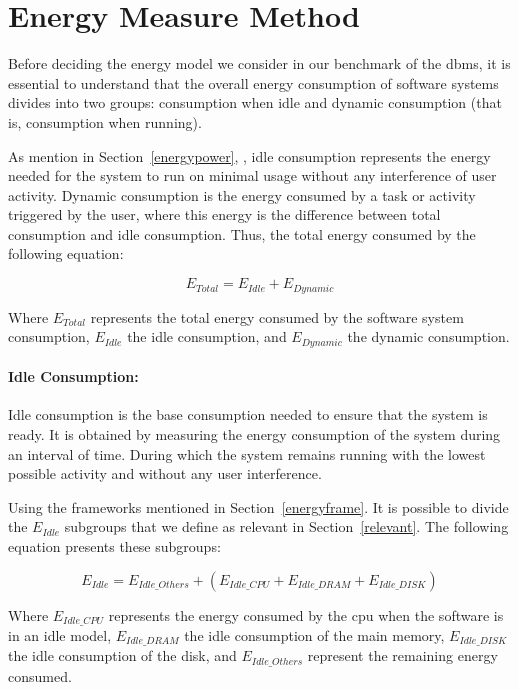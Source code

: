 
\section{Energy Measure Method}

\label{sc:enerymodel}

Before deciding the energy model we consider in our benchmark of the \gls{dbms}, it is essential to understand that the overall energy consumption of software systems divides into two groups: consumption when idle and dynamic consumption (that is, consumption when running). 

As mention in Section~\ref{energypower}, , idle consumption represents the energy needed for the system to run on minimal usage without any interference of user activity. Dynamic consumption is the energy consumed by a task or activity triggered by the user, where this energy is the difference between total consumption and idle consumption. Thus, the total energy consumed by the following equation:

\begin{equation}
E_{Total} = E_{Idle} + E_{Dynamic}
\end{equation}$
$

Where $E_{Total}$ represents the total energy consumed by the software system consumption,  $E_{Idle}$ the idle consumption, and $E_{Dynamic}$ the dynamic consumption.

\paragraph{Idle Consumption:} Idle consumption is the base consumption needed to ensure that the system is ready. It is obtained by measuring the energy consumption of the system during an interval of time. During which the system remains running with the lowest possible activity and without any user interference. 

Using the frameworks mentioned in Section~\ref{energyframe}. It is possible to divide the $E_{Idle}$ subgroups that we define as relevant in Section~\ref{relevant}. The following equation presents these subgroups:

\begin{equation}
E_{Idle} = E_{Idle\_Others} + ( E_{Idle\_CPU} + E_{Idle\_DRAM} + E_{Idle\_DISK})
\end{equation}$
$

Where $E_{Idle\_CPU}$ represents the energy consumed by the \gls{cpu} when the software is in an idle model, $E_{Idle\_DRAM}$ the idle consumption of the main memory, $E_{Idle\_DISK}$ the idle consumption of the disk, and $E_{Idle\_Others}$ represent the remaining energy consumed.

